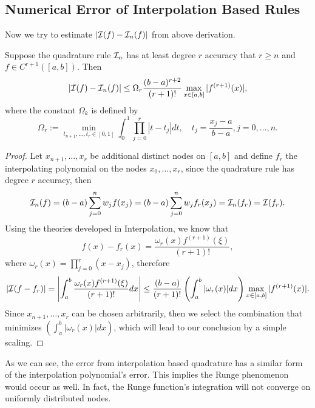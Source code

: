 \subsection{Numerical Error of Interpolation Based Rules}
Now we try to estimate $|\mathcal I(f) - \mathcal I_n(f)|$ from above derivation. 
\begin{theorem}\label{THM: ERROR QUAD RULE}Suppose the quadrature rule $\mathcal I_n$ has at least degree $r$ accuracy that $r\ge n$ and $f\in C^{r+1}([a, b])$. 
    Then 
    \begin{equation}
        |\mathcal I(f) - \mathcal I_n(f)| \le \Omega_r \frac{(b-a)^{r+2}}{(r+1)!} \max_{x\in[a, b]} |f^{(r+1)}(x)|,
    \end{equation}
    where the constant $\Omega_k$ is defined by 
    \begin{equation}
        \Omega_r := \min_{t_{n+1}, \dots, t_r\in [0, 1]} \int_0^1 \prod_{j=0}^r |t - t_j| dt, \quad t_j = \frac{x_j - a}{b-a}, j=0,\dots, n.
    \end{equation}
\end{theorem}
\begin{proof}
    Let $x_{n+1}, \dots, x_{r}$ be additional distinct nodes on $[a, b]$ and define $f_r$ the interpolating polynomial on the nodes $x_0,\dots, x_r$, since the quadrature rule has degree $r$ accuracy, then 
    $$\mathcal I_n(f) = (b-a)\sum_{j=0}^n w_j f(x_j) = (b-a)\sum_{j=0}^n w_j f_r(x_j) = \mathcal I_n(f_r) = \mathcal I(f_r).$$
    Using the theories developed in Interpolation, we know that 
\begin{equation}
    f(x) - f_r(x) = \frac{\omega_r(x) f^{(r+1)}(\xi)}{(r+1)!},
\end{equation}
where $\omega_r(x) = \prod_{j=0}^r (x - x_j)$, therefore 
\begin{equation}
   | \mathcal I(f - f_r)| = \left| \int_a^b \frac{\omega_r(x) f^{(r+1)}(\xi)}{(r+1)!} dx \right|\le \frac{(b-a)}{(r+1)!} \left(\int_a^b |\omega_r(x)|dx \right)  \max_{x\in[a,b]}|f^{(r+1)}(x)|.
\end{equation}
Since $x_{n+1},\dots, x_r$ can be chosen arbitrarily, then we select the combination that minimizes $  \left(\int_a^b |\omega_r(x)|dx \right)$, which will lead to our conclusion by a simple scaling.
\end{proof}
\begin{remark}
    As we can see, the error from interpolation based quadrature has a similar form of the interpolation polynomial's error. This implies the Runge phenomenon would occur as well. In fact, the Runge function's integration will not converge on uniformly distributed nodes.
\end{remark}

